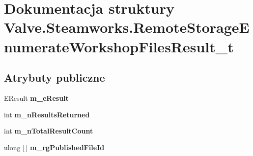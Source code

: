 \hypertarget{struct_valve_1_1_steamworks_1_1_remote_storage_enumerate_workshop_files_result__t}{}\section{Dokumentacja struktury Valve.\+Steamworks.\+Remote\+Storage\+Enumerate\+Workshop\+Files\+Result\+\_\+t}
\label{struct_valve_1_1_steamworks_1_1_remote_storage_enumerate_workshop_files_result__t}
\subsection*{Atrybuty publiczne}
\begin{DoxyCompactItemize}
\item 
\mbox{\label{struct_valve_1_1_steamworks_1_1_remote_storage_enumerate_workshop_files_result__t_a9918c1875dd01cacae927a7e6804f2c3}} 
E\+Result {\bfseries m\+\_\+e\+Result}
\item 
\mbox{\label{struct_valve_1_1_steamworks_1_1_remote_storage_enumerate_workshop_files_result__t_a1be72fa2652b748370e4fef33010d433}} 
int {\bfseries m\+\_\+n\+Results\+Returned}
\item 
\mbox{\label{struct_valve_1_1_steamworks_1_1_remote_storage_enumerate_workshop_files_result__t_a38239c977b9a71c8962a8ccd2da6aa4d}} 
int {\bfseries m\+\_\+n\+Total\+Result\+Count}
\item 
\mbox{\label{struct_valve_1_1_steamworks_1_1_remote_storage_enumerate_workshop_files_result__t_a06a2d2595f0bf7b3c66bb1df672820af}} 
ulong \mbox{[}$\,$\mbox{]} {\bfseries m\+\_\+rg\+Published\+File\+Id}
\item 
\mbox{\label{struct_valve_1_1_steamworks_1_1_remote_storage_enumerate_workshop_files_result__t_aa973158b0041031437865d7cc98dbfc6}} 

\end{DoxyCompactItemize}
